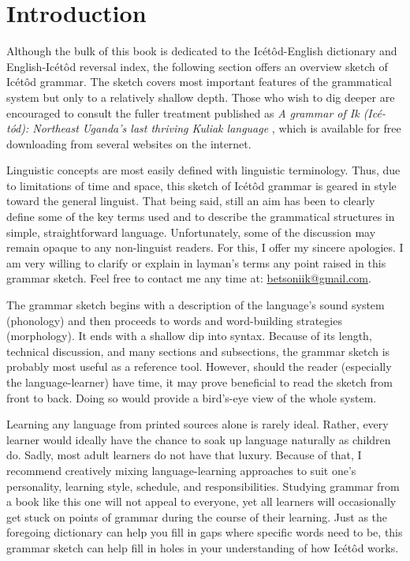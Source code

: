 \section{Introduction}


Although the bulk of this book is dedicated to the Icétôd-English dictionary and English-Icétôd reversal index, the following section offers an overview sketch of Icétôd grammar. The sketch covers most important features of the grammatical system but only to a relatively shallow depth. Those who wish to dig deeper are encouraged to consult the fuller treatment published as \textit{A grammar of Ik (Icé-tód): Northeast Uganda’s last thriving Kuliak language} \citep{Schrock2014}, which is available for free downloading from several websites on the internet. 

Linguistic concepts are most easily defined with linguistic terminology. Thus, due to limitations of time and space, this sketch of Icétôd grammar is geared in style toward the general linguist. That being said, still an aim has been to clearly define some of the key terms used and to describe the grammatical structures in simple, straightforward language. Unfortunately, some of the discussion may remain opaque to any non-linguist readers. For this, I offer my sincere apologies. I am very willing to clarify or explain in layman’s terms any point raised in this grammar sketch. Feel free to contact me any time at: \href{mailto:betsoniik@gmail.com}{betsoniik@gmail.com}.

The grammar sketch begins with a description of the language’s sound system (phonology) and then proceeds to words and word-building strategies (morphology). It ends with a shallow dip into syntax. Because of its length, technical discussion, and many sections and subsections, the grammar sketch is probably most useful as a reference tool. However, should the reader (especially the language-learner) have time, it may prove beneficial to read the sketch from front to back. Doing so would provide a bird’s-eye view of the whole system.

Learning any language from printed sources alone is rarely ideal. Rather, every learner would ideally have the chance to soak up language naturally as children do. Sadly, most adult learners do not have that luxury. Because of that, I recommend creatively mixing language-learning approaches to suit one’s personality, learning style, schedule, and responsibilities. Studying grammar from a book like this one will not appeal to everyone, yet all learners will occasionally get stuck on points of grammar during the course of their learning. Just as the foregoing dictionary can help you fill in gaps where specific words need to be, this grammar sketch can help fill in holes in your understanding of how Icétôd works.